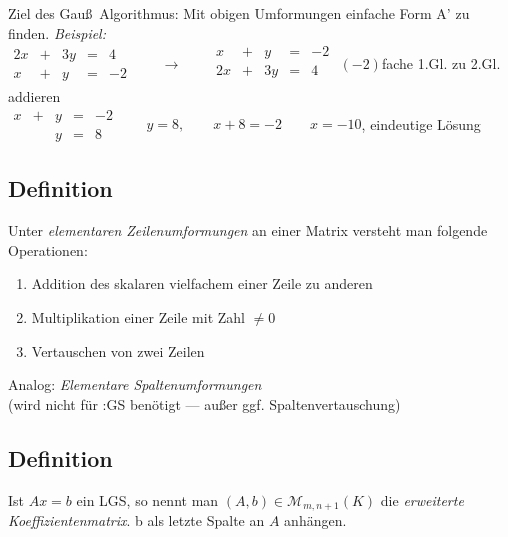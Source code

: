 Ziel des Gau\ss\ Algorithmus: Mit obigen Umformungen einfache Form A' zu finden.
\emph{Beispiel:}\label{bsp1}\\
$\begin{matrix}
2x &+& 3y &=& 4\\
x &+& y &=& -2
\end{matrix}\qquad \rightarrow\qquad \begin{matrix}
x &+& y &=& -2\\
2x &+& 3y &=& 4\\
\end{matrix}$ $(-2)$fache 1.Gl. zu 2.Gl. addieren\bigskip\\
$\begin{matrix}
x &+& y &=& -2\\
& & y &=& 8
\end{matrix}\qquad y = 8,\qquad x+8 = -2\qquad x=-10$, eindeutige Lösung
\subsection{Definition}\label{sec:9.7}
Unter \emph{elementaren Zeilenumformungen} an einer Matrix versteht man folgende Operationen:
\begin{enumerate}[-]
\item Addition des skalaren vielfachem einer Zeile zu anderen
\item Multiplikation einer Zeile mit Zahl $\ne 0$
\item Vertauschen von zwei Zeilen
\end{enumerate}
Analog: \emph{Elementare Spaltenumformungen}\\ (wird nicht für :GS benötigt --- au\ss er ggf. Spaltenvertauschung)
\subsection{Definition}\label{sec:9.8}
Ist $Ax =b$ ein LGS, so nennt man $(A,b) \in 
\mathcal{M}_{m,n+1}(K)$ die \emph{erweiterte Koeffizientenmatrix}. b als letzte Spalte an $A$ anhängen.
